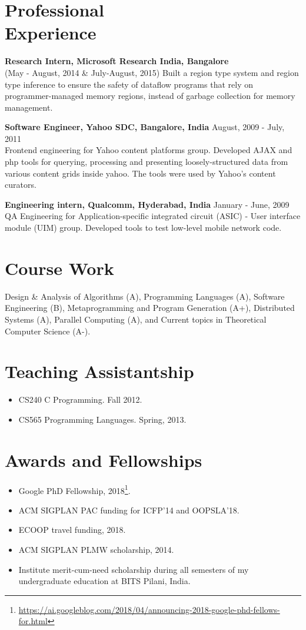 \documentclass[margin,line]{res}
\begin{document}
\begin{resume}
\section{Professional \\ Experience}

{\bf Research Intern, Microsoft Research India, Bangalore} \\
(May - August, 2014 \& July-August, 2015) 
Built a region type system and region type inference to ensure the
safety of dataflow programs that rely on programmer-managed memory
regions, instead of garbage collection for memory management.

{\bf Software Engineer, Yahoo SDC, Bangalore, India} \hfill August, 2009 -
July, 2011\\
Frontend engineering for Yahoo content platforms group. Developed AJAX
and php tools for querying, processing and presenting
loosely-structured data from various content grids inside yahoo. The
tools were used by Yahoo's content curators.

{\bf Engineering intern, Qualcomm, Hyderabad, India} \hfill January - June, 2009\\
QA Engineering for Application-specific integrated circuit (ASIC) -
User interface module (UIM) group. Developed tools to test low-level
mobile network code.

\section{Course Work}
Design \& Analysis of Algorithms (A), Programming Languages (A),
Software Engineering (B), Metaprogramming and Program Generation (A+),
Distributed Systems (A), Parallel Computing (A), and Current topics in
Theoretical Computer Science (A-).  

\section{Teaching Assistantship}
\begin{itemize}
\item CS240 C Programming. Fall 2012.
\item CS565 Programming Languages. Spring, 2013.
\end{itemize}

\section{Awards and Fellowships}
\begin{itemize}
  \item Google PhD Fellowship, 2018\footnote{\url{https://ai.googleblog.com/2018/04/announcing-2018-google-phd-fellows-for.html}}.
  \item ACM SIGPLAN PAC funding for ICFP'14 and OOPSLA'18.
  \item ECOOP travel funding, 2018.
  \item ACM SIGPLAN PLMW scholarship, 2014.
  \item Institute merit-cum-need scholarship during all semesters of
    my undergraduate education at BITS Pilani, India.
\end{itemize}


\end{resume}
\end{document}
